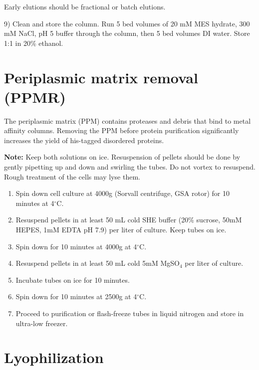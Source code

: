 \begin{enumerate}
Early elutions should be fractional or batch elutions.

9) Clean and store the column. Run 5 bed volumes of 20 mM MES hydrate, 300 mM NaCl, pH 5 buffer through the column, then 5 bed volumes DI water.  Store 1:1 in 20\% ethanol.

\end{enumerate}

\section{Periplasmic matrix removal (PPMR)}
\label{sec:ppmr}

The periplasmic matrix (PPM) contains proteases and debris that bind to metal affinity columns.  Removing the PPM before protein purification significantly increases the yield of his-tagged disordered proteins.

\textbf{Note:} Keep both solutions on ice.  Resuspension of pellets should be done by gently pipetting up and down and swirling the tubes.  Do not vortex to resuspend.  Rough treatment of the cells may lyse them.

\begin{enumerate}

\item Spin down cell culture at 4000g (Sorvall centrifuge, GSA rotor) for 10 minutes at 4$^\circ$C.

\item Resuspend pellets in at least 50 mL cold SHE buffer (20\% sucrose, 50mM HEPES, 1mM EDTA pH 7.9) per liter of culture.  Keep tubes on ice.

\item Spin down for 10 minutes at 4000g at 4$^\circ$C.

\item Resuspend pellets in at least 50 mL cold 5mM MgSO$_4$ per liter of culture.

\item Incubate tubes on ice for 10 minutes.

\item Spin down for 10 minutes at 2500g at 4$^\circ$C.

\item Proceed to purification or flash-freeze tubes in liquid nitrogen and store in ultra-low freezer.
\end{enumerate}

\section{Lyophilization}

